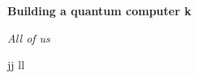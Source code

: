 \documentclass[a4paper]{article}
\begin{document}
\begin{center}
    \Huge \textbf{Building a quantum computer k}
\end{center}
\vspace{-1.5em}

\begin{center}
    \emph{\large All of us}
\end{center}
\vspace{0.5em}

jj
\cite{noauthor_discovery_nodate}
ll








\printbibliography
\end{document}
